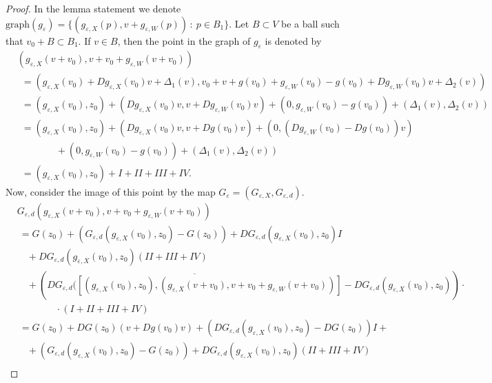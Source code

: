\documentclass[10pt,a4paper]{amsart}
\begin{document}
	 		\begin{proof}
	 			In the lemma statement we denote $\textrm{graph}(g_\varepsilon) = \{ (g_{\varepsilon,X}(p),v+g_{\varepsilon,W}(p))\,:\ p\in B_1 \}$. Let $B\subset V$ be a ball such that $v_0+B\subset B_1$.
 If $v\in B$, then the point in the graph of $g_\varepsilon$ is denoted by
	 			\begin{align*}
	 				&  (g_{\varepsilon,X}(v+v_0),v+v_0+g_{\varepsilon,W}(v+v_0)) \\
	 				& \ \ =    \left(g_{\varepsilon,X}(v_0)+Dg_{\varepsilon,X}(v_0)v+\Delta_1(v),v_0+v+g(v_0)+g_{\varepsilon,W}(v_0)-g(v_0)+
	 				Dg_{\varepsilon,W}(v_0)v+\Delta_2(v)\right)\\
	 				& \ \ = (g_{\varepsilon,X}(v_0),z_0) + \left(Dg_{\varepsilon,X}(v_0)v,v+Dg_{\varepsilon,W}(v_0)v\right) + (0,g_{\varepsilon,W}(v_0)-g(v_0)) +  \left(\Delta_1(v),\Delta_2(v)\right)\\
	 				& \ \  = (g_{\varepsilon,X}(v_0),z_0) + \left(Dg_{\varepsilon,X}(v_0)v,v+Dg(v_0)v\right) +   \left(0,\left(Dg_{\varepsilon,W}(v_0)-Dg(v_0)\right)v\right) \\
	 				& \qquad \qquad + (0,g_{\varepsilon,W}(v_0)-g(v_0)) +  \left(\Delta_1(v),\Delta_2(v)\right)\\
	 				& \ \  = (g_{\varepsilon,X}(v_0),z_0) + I + II + III + IV.
	 			\end{align*}
	 			Now, consider the image of this point by the map $G_\varepsilon=(G_{\varepsilon,X},G_{\varepsilon,d})$.
	 			\begin{align*}
	 				& G_{\varepsilon,d}(g_{\varepsilon,X}(v+v_0),v+v_0+g_{\varepsilon,W}(v+v_0)) \\
	 				& \  = G(z_0) + (G_{\varepsilon,d}(g_{\varepsilon,X}(v_0),z_0)-G(z_0)) + D G_{\varepsilon,d}(g_{\varepsilon,X}(v_0),z_0)I \\
	 				& \quad + DG_{\varepsilon,d}(g_{\varepsilon,X}(v_0),z_0)(II+III+IV)\\
	 				& \quad +(\overline{DG_{\varepsilon,d}([(g_{\varepsilon,X}(v_0),z_0),(g_{\varepsilon,X}(v+v_0),v+v_0+g_{\varepsilon,W}(v+v_0))]}-DG_{\varepsilon,d}(g_{\varepsilon,X}(v_0),z_0))\cdot\\
	 				& \qquad \qquad \cdot(I+II+III+IV)\\
	 				& \  = G(z_0) + DG(z_0)\left(v+Dg(v_0)v\right)  + \left(D G_{\varepsilon,d}(g_{\varepsilon,X}(v_0),z_0)-DG(z_0)\right)I + \\
	 				& \quad  +  (G_{\varepsilon,d}(g_{\varepsilon,X}(v_0),z_0)-G(z_0)) + D G_{\varepsilon,d}(g_{\varepsilon,X}(v_0),z_0)(II+III+IV)\\

\end{align*}
\end{proof}
\end{document}
